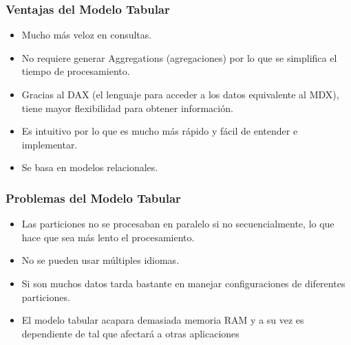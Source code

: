 \documentclass[11pt,a4paper]{article}
\begin{document}
	 	\subsubsection{Ventajas del Modelo Tabular} 
	 	\begin{itemize}
	 		
	 		\item Mucho más veloz en consultas.
	 		\item No requiere generar Aggregations (agregaciones) por lo que se simplifica el tiempo de procesamiento.
	 		\item Gracias al DAX (el lenguaje para acceder a los datos equivalente al MDX), tiene mayor flexibilidad para obtener información.
	 		\item Es intuitivo por lo que es mucho más rápido y fácil de entender e implementar.
	 		\item Se basa en modelos relacionales.
	 		
	 	\end{itemize}
	 	
	 	\subsubsection{Problemas del Modelo Tabular} 
	 	\begin{itemize}
	 		
	 		\item Las particiones no se procesaban en paralelo si no secuencialmente, lo que hace que sea más lento el procesamiento.
	 		\item No se pueden usar múltiples idiomas.
	 		\item Si son muchos datos tarda bastante en manejar configuraciones de diferentes particiones.
	 		\item El modelo tabular acapara demasiada memoria RAM y a su vez es dependiente de tal que afectará a otras aplicaciones
	 		
	 	\end{itemize} 	
	 	
\end{document}
